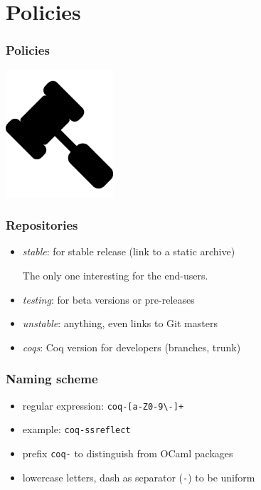 \documentclass{beamer}
\begin{document}
  \section{Policies}
  \begin{frame}
    \frametitle{Policies}
    \begin{center}
      \includegraphics[width=4cm]{images/policies}
    \end{center}
  \end{frame}
  \begin{frame}
    \frametitle{Repositories}
    \begin{itemize}
      \item \emph{stable}: for stable release (link to a static archive)

        The only one interesting for the end-users.
      \item \emph{testing}: for beta versions or pre-releases
      \item \emph{unstable}: anything, even links to Git masters
      \item \emph{coqs}: Coq version for developers (branches, trunk)
    \end{itemize}
  \end{frame}
  \begin{frame}
    \frametitle{Naming scheme}
    \begin{itemize}
      \item regular expression: \texttt{coq-[a-Z0-9\textbackslash-]+}
      \item example: \texttt{coq-ssreflect}
      \item prefix \texttt{coq-} to distinguish from OCaml packages
      \item lowercase letters, dash as separator (\texttt{-}) to be uniform
    \end{itemize}
  \end{frame}
\end{document}
